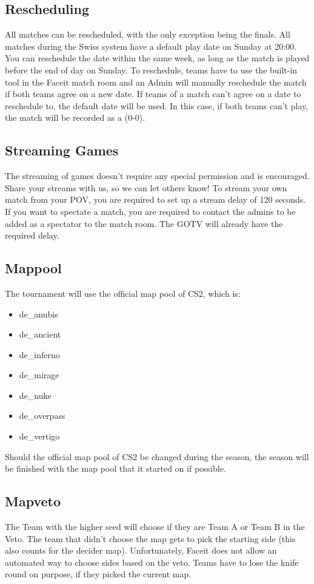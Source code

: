\documentclass{article}
\newcommand{\TeamA}{{\color{red}Team A }}
\newcommand{\TeamB}{{\color{blue}Team B }}
\begin{document}
\subsection{Rescheduling}\label{reschedule}
All matches can be rescheduled, with the only exception being the finals. All matches during the Swiss system have a default play date on Sunday at 20:00. You can reschedule the date within the same week, as long as the match is played before the end of day
on Sunday. To reschedule, teams have to use the built-in tool in the Faceit match room and an Admin will 
manually reschedule the match if both teams agree on a new date. If teams of a match can't agree on a date to
reschedule to, the default date will be used. In this case, if both teams can't play, the match will be
recorded as a (0-0).

\subsection{Streaming Games}\label{streaming}
The streaming of games doesn't require any special permission and is encouraged. Share your streams with us, so we can let others know! To stream your own match from your POV, you are required to set up a stream delay of 120 seconds. If you want to spectate a match, you are required to contact the admins to be added as a spectator to the match room. The GOTV will already have the required delay.


\subsection{Mappool}\label{mappool}
The tournament will use the official map pool of CS2, which is:
\begin{itemize}
    \item de\_anubis
    \item de\_ancient
    \item de\_inferno
    \item de\_mirage
    \item de\_nuke
    \item de\_overpass
    \item de\_vertigo 
\end{itemize}
Should the official map pool of CS2 be changed during the season, the season will be finished with the map pool that it started on if possible.


\subsection{Mapveto}\label{veto}
The Team with the higher seed will choose if they are \TeamA or \TeamB in the Veto. The team that didn't 
choose the map gets to pick the starting side (this also counts for the decider map). Unfortunately, Faceit
does not allow an automated way to choose sides based on the veto. Teams have to lose the knife round on
purpose, if they picked the current map.\\
\end{document}
